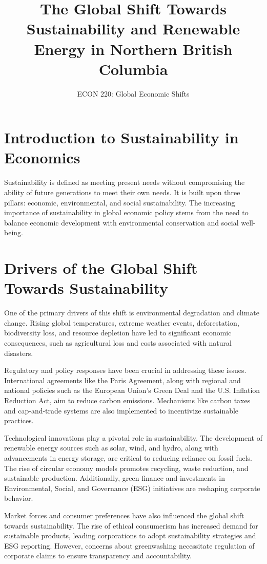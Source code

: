 \documentclass[12pt]{article}
\begin{document}
\title{The Global Shift Towards Sustainability and Renewable Energy in Northern British Columbia}
\author{ECON 220: Global Economic Shifts}
\date{}
\maketitle

\tableofcontents
\newpage
\section{Introduction to Sustainability in Economics}
Sustainability is defined as meeting present needs without compromising the ability of future generations to meet their own needs. It is built upon three pillars: economic, environmental, and social sustainability. The increasing importance of sustainability in global economic policy stems from the need to balance economic development with environmental conservation and social well-being.

\section{Drivers of the Global Shift Towards Sustainability}
One of the primary drivers of this shift is environmental degradation and climate change. Rising global temperatures, extreme weather events, deforestation, biodiversity loss, and resource depletion have led to significant economic consequences, such as agricultural loss and costs associated with natural disasters. 

Regulatory and policy responses have been crucial in addressing these issues. International agreements like the Paris Agreement, along with regional and national policies such as the European Union's Green Deal and the U.S. Inflation Reduction Act, aim to reduce carbon emissions. Mechanisms like carbon taxes and cap-and-trade systems are also implemented to incentivize sustainable practices.

Technological innovations play a pivotal role in sustainability. The development of renewable energy sources such as solar, wind, and hydro, along with advancements in energy storage, are critical to reducing reliance on fossil fuels. The rise of circular economy models promotes recycling, waste reduction, and sustainable production. Additionally, green finance and investments in Environmental, Social, and Governance (ESG) initiatives are reshaping corporate behavior.

Market forces and consumer preferences have also influenced the global shift towards sustainability. The rise of ethical consumerism has increased demand for sustainable products, leading corporations to adopt sustainability strategies and ESG reporting. However, concerns about greenwashing necessitate regulation of corporate claims to ensure transparency and accountability.
\end{document}
